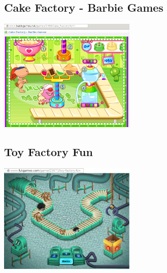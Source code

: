 \documentclass[a4paper]{scrartcl}
\begin{document}
    \begin{multicols}{2}
        \subsection{Cake Factory - Barbie Games}
            \includegraphics[width=0.49\textwidth]{similar_games/CakeFactory}

        \subsection{Toy Factory Fun}
            \includegraphics[width=0.49\textwidth]{similar_games/ToyFactoryFun}
    \end{multicols}
\end{document}
